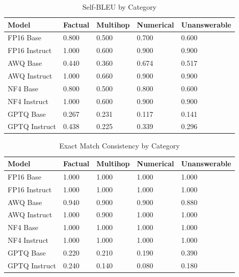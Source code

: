 \documentclass[11pt,a4paper]{article}
\begin{document}
\begin{table}[H]
\centering
\caption{Self-BLEU by Category}
\small
\begin{tabularx}{\textwidth}{@{}X C{2cm} C{2cm} C{2cm} C{2cm}@{}}
\toprule
\textbf{Model} & \textbf{Factual} & \textbf{Multihop} & \textbf{Numerical} & \textbf{Unanswerable} \\
\midrule
FP16 Base & 0.800 & 0.500 & 0.700 & 0.600 \\
FP16 Instruct & 1.000 & 0.600 & 0.900 & 0.900 \\
AWQ Base & 0.440 & 0.360 & 0.674 & 0.517 \\
AWQ Instruct & 1.000 & 0.660 & 0.900 & 0.900 \\
NF4 Base & 0.800 & 0.500 & 0.800 & 0.600 \\
NF4 Instruct & 1.000 & 0.600 & 0.900 & 0.900 \\
GPTQ Base & 0.267 & 0.231 & 0.117 & 0.141 \\
GPTQ Instruct & 0.438 & 0.225 & 0.339 & 0.296 \\
\bottomrule
\end{tabularx}
\end{table}

\begin{table}[H]
\centering
\caption{Exact Match Consistency by Category}
\small
\begin{tabularx}{\textwidth}{@{}X C{2cm} C{2cm} C{2cm} C{2cm}@{}}
\toprule
\textbf{Model} & \textbf{Factual} & \textbf{Multihop} & \textbf{Numerical} & \textbf{Unanswerable} \\
\midrule
FP16 Base & 1.000 & 1.000 & 1.000 & 1.000 \\
FP16 Instruct & 1.000 & 1.000 & 1.000 & 1.000 \\
AWQ Base & 0.940 & 0.900 & 0.900 & 0.880 \\
AWQ Instruct & 1.000 & 0.900 & 1.000 & 1.000 \\
NF4 Base & 1.000 & 1.000 & 1.000 & 1.000 \\
NF4 Instruct & 1.000 & 1.000 & 1.000 & 1.000 \\
GPTQ Base & 0.220 & 0.210 & 0.190 & 0.390 \\
GPTQ Instruct & 0.240 & 0.140 & 0.080 & 0.180 \\
\bottomrule
\end{tabularx}
\end{table}
\end{document}
